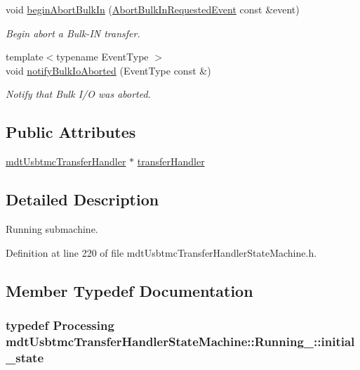 \begin{DoxyCompactItemize}
void \hyperlink{structmdt_usbtmc_transfer_handler_state_machine_1_1_running___a3b6531247a7ba3c21c05af6087f53d9a}{begin\-Abort\-Bulk\-In} (\hyperlink{structmdt_usbtmc_transfer_handler_state_machine_1_1_abort_bulk_in_requested_event}{Abort\-Bulk\-In\-Requested\-Event} const \&event)
\begin{DoxyCompactList}\small\item\em Begin abort a Bulk-\/\-I\-N transfer. \end{DoxyCompactList}\item 
{\footnotesize template$<$typename Event\-Type $>$ }\\void \hyperlink{structmdt_usbtmc_transfer_handler_state_machine_1_1_running___ac06767040104b67f2d27cd35be8b962d}{notify\-Bulk\-Io\-Aborted} (Event\-Type const \&)
\begin{DoxyCompactList}\small\item\em Notify that Bulk I/\-O was aborted. \end{DoxyCompactList}\end{DoxyCompactItemize}
\subsection*{Public Attributes}
\begin{DoxyCompactItemize}
\item 
\hyperlink{classmdt_usbtmc_transfer_handler}{mdt\-Usbtmc\-Transfer\-Handler} $\ast$ \hyperlink{structmdt_usbtmc_transfer_handler_state_machine_1_1_running___ad40e581cd472f8b343d6ab3ba790bd89}{transfer\-Handler}
\end{DoxyCompactItemize}


\subsection{Detailed Description}
Running submachine. 

Definition at line 220 of file mdt\-Usbtmc\-Transfer\-Handler\-State\-Machine.\-h.



\subsection{Member Typedef Documentation}
\hypertarget{structmdt_usbtmc_transfer_handler_state_machine_1_1_running___a518a24b7247d03bb8790c6df63c3cd0e}{
\subsubsection[{initial\-\_\-state}]{\setlength{\rightskip}{0pt plus 5cm}typedef {\bf Processing} {\bf mdt\-Usbtmc\-Transfer\-Handler\-State\-Machine\-::\-Running\-\_\-\-::initial\-\_\-state}}}\label{structmdt_usbtmc_transfer_handler_state_machine_1_1_running___a518a24b7247d03bb8790c6df63c3cd0e}


